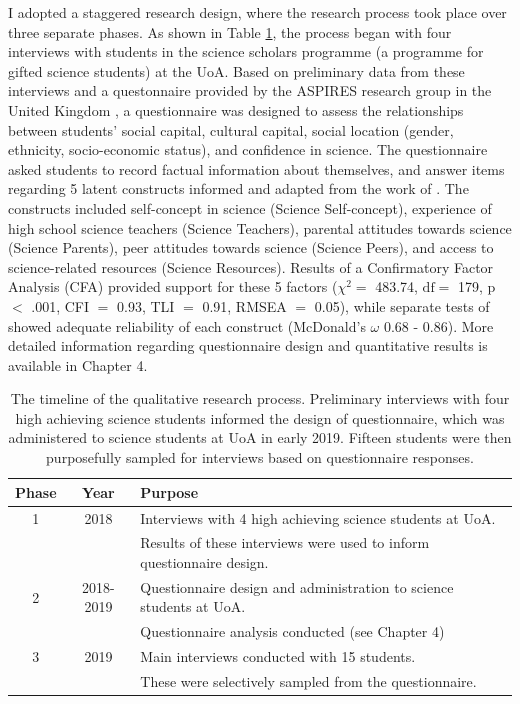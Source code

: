 I adopted a staggered research design, where the research process took place over three separate phases. As shown in Table \ref{tab:Phases}, the process began with four interviews with students in the science scholars programme (a programme for gifted science students) at the UoA. Based on preliminary data from these interviews and a questonnaire provided by the ASPIRES research group in the United Kingdom \citep{dewitt2011high}, a questionnaire was designed to assess the relationships between students' social capital, cultural capital, social location (gender, ethnicity, socio-economic status), and confidence in science. The questionnaire asked students to record factual information about themselves, and answer items regarding 5 latent constructs informed and adapted from the work of \cite{dewitt2011high}. The constructs included self-concept in science (Science Self-concept), experience of high school science teachers (Science Teachers), parental attitudes towards science (Science Parents), peer attitudes towards science (Science Peers), and access to science-related resources (Science Resources). Results of a Confirmatory Factor Analysis (CFA) provided support for these 5 factors ($\chi^{2} =$ 483.74, $\mathrm{df} =$ 179, p $<$ .001, CFI  $=$ 0.93, TLI  $=$ 0.91, RMSEA $=$ 0.05), while separate tests of showed adequate reliability of each construct (McDonald's $\omega$ 0.68 - 0.86). More detailed information regarding questionnaire design and quantitative results is available in Chapter 4. 
\begin{table}[ht]
\begin{tabular}{c|c|l}
                      
Phase  & Year & Purpose    \\ \hline
1   & 2018  & Interviews with 4 high achieving science students at UoA.     \\
& & Results of these interviews were used to inform questionnaire design. \\ \hline
2  & 2018-2019 & Questionnaire design and administration to science students at UoA.  \\
& & Questionnaire analysis conducted (see Chapter 4)\\ \hline
3 & 2019 & Main interviews conducted with 15 students. \\
& & These were selectively sampled from the questionnaire. \\ \hline
\end{tabular}
\caption{\label{tab:Phases} The timeline of the qualitative research process. Preliminary interviews with four high achieving science students informed the design of questionnaire, which was administered to science students at UoA in early 2019. Fifteen students were then purposefully sampled for interviews based on questionnaire responses.}
\end{table}

